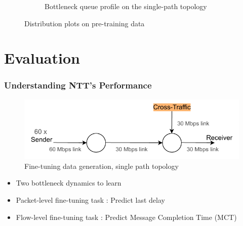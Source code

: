 \documentclass{beamer}
\begin{document}
\begin{frame}
\begin{figure}[h]
\begin{subfigure}[h]{0.5\textwidth}
\begin{center}
        \caption{Bottleneck queue profile on the single-path topology}
        \end{center}    
    \end{subfigure}
    \caption{Distribution plots on pre-training data}
    \label{fig:datadist}
    \end{figure}

\end{frame}




\section{Evaluation}

\begin{frame}
\frametitle{Understanding NTT's Performance}


\begin{figure}[h]
  \begin{center}
    \includegraphics[scale=0.8]{figures/simple_topo_ft.pdf}
    \caption{Fine-tuning data generation, single path topology}
    \label{fig:topo_ft}
  \end{center}
\end{figure}

\pause 

\begin{itemize}
    \item<1-> Two bottleneck dynamics to learn 
    \item<1-> Packet-level fine-tuning task : Predict last delay
    \item<1-> Flow-level fine-tuning task : Predict Message Completion Time (MCT)
    \end{itemize}

\end{frame}
\end{document}
